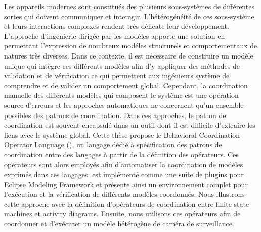 
\begin{frenchabstract}
Les appareils modernes sont constitu\'es des plusieurs sous-syst\`emes de diff\'erentes sortes qui doivent communiquer et interagir. L'h\'et\'erog\'en\'eit\'e de ces sous-syst\`eme et leurs interactions complexes rendent tr\`es d\'elicate leur d\'eveloppement. L'approche d'ing\'enierie dirig\'ee par les mod\`eles apporte une solution en permettant l'expression de nombreux mod\'eles structurels et comportementaux de natures tr\`es diverses. Dans ce contexte, il est n\'ecessaire de construire un mod\`ele unique qui int\`egre ces diff\'erents mod\`eles afin d'y appliquer des m\'ethodes de validation et de v\'erification ce qui permettent aux ing\'enieurs syst\`eme de comprendre et de valider un comportement global. Cependant, la coordination manuelle des diff\'erents mod\`eles qui composent le syst\`eme est une op\'eration source d'erreurs et les approches automatiques ne concernent qu'un ensemble possibles des patrons de coordination. Dans ces approches, le patron de coordination est souvent encapsul\'e dans un outil dont il est difficile d'extraire les liens avec le syst\`eme global. Cette th\`ese propose le Behavioral Coordination Operator Language (\bcool), un langage d\'edi\'e \`a sp\'ecification des patrons de coordination entre des langages \`a partir de la d\'efinition des op\'erateurs. Ces op\'erateurs sont alors employ\'es afin d'automatiser la coordination de mod\`eles exprim\'es dans ces langages. \bcool est impl\'ement\'e comme une suite de plugins pour Eclipse Modeling Framework et pr\'esente ainsi un environnement complet pour l'ex\'ecution et la v\'erification de diff\'erents mod\`eles coordonn\'es. Nous illustrons cette approche avec la d\'efinition d'op\'erateurs de coordination entre finite state machines et activity diagrams. Ensuite, nous utilisons ces op\'erateurs afin de coordonner et d'ex\'ecuter un mod\`ele h\'et\'erog\`ene de cam\'era de surveillance.
\end{frenchabstract}



\cleardoublepage
{}


